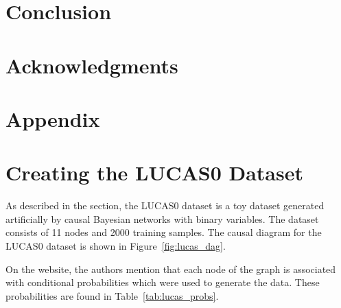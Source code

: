\documentclass{article}
\begin{document}
\section{Conclusion}


\section*{Acknowledgments}



\newpage


\newpage

\section*{Appendix}

\appendix
\section{Creating the LUCAS0 Dataset}
\label{create}

As described in the  section, the LUCAS0 dataset is a toy dataset generated 
artificially by causal Bayesian networks with binary variables. The dataset consists of 
11 nodes and 2000 training samples. The causal diagram for the LUCAS0 dataset is shown in Figure~\ref{fig:lucas_dag}.

On the website, the authors mention that each node of the graph is associated with conditional probabilities
which were used to generate the data. These probabilities are found in Table~\ref{tab:lucas_probs}.
\end{document}
